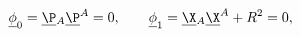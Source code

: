 \begin{equation}
\underline{\phi}_0=\underline{\P}{}_A
\underline{\P}{}^A=0,\qquad
\underline{\phi}_1=\underline{\X}{}_A\underline{\X}^A+R^2=0,
\label{adsl}
\end{equation}


